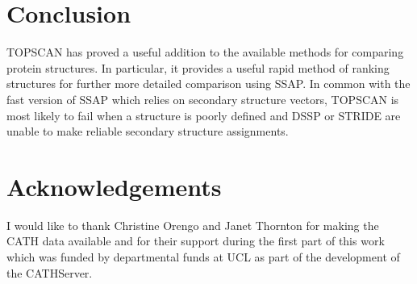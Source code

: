 \documentclass{article}
\begin{document}
\section{Conclusion}
TOPSCAN has proved a useful addition to the available methods for
comparing protein structures. In particular, it provides a useful
rapid method of ranking structures for further more detailed
comparison using SSAP. In common with the fast version of SSAP which
relies on secondary structure vectors, TOPSCAN is most likely to fail
when a structure is poorly defined and DSSP or STRIDE are unable to
make reliable secondary structure assignments.

\section{Acknowledgements}
I would like to thank Christine Orengo and Janet Thornton for making
the CATH data available and for their support during the first part of
this work which was funded by departmental funds at UCL as part of the
development of the CATHServer. 
\end{document}
